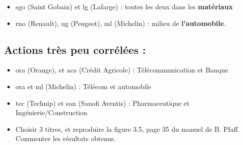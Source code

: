\documentclass[
]{article}
\newenvironment{Shaded}{\begin{snugshade}}{\end{snugshade}}
\newcommand{\AttributeTok}[1]{\textcolor[rgb]{0.77,0.63,0.00}{#1}}
\newcommand{\DecValTok}[1]{\textcolor[rgb]{0.00,0.00,0.81}{#1}}
\newcommand{\FunctionTok}[1]{\textcolor[rgb]{0.00,0.00,0.00}{#1}}
\newcommand{\NormalTok}[1]{#1}
\newcommand{\OtherTok}[1]{\textcolor[rgb]{0.56,0.35,0.01}{#1}}
\newcommand{\SpecialCharTok}[1]{\textcolor[rgb]{0.00,0.00,0.00}{#1}}
\newcommand{\StringTok}[1]{\textcolor[rgb]{0.31,0.60,0.02}{#1}}
\providecommand{\tightlist}{%
  \setlength{\itemsep}{0pt}\setlength{\parskip}{0pt}}
\begin{document}
\begin{itemize}
\tightlist
\item
  sgo (Saint Gobain) et lg (Lafarge) : toutes les deux dans les
  \textbf{matériaux}
\item
  rno (Renault), ug (Peugeot), ml (Michelin) : milieu de
  \textbf{l'automobile}.
\end{itemize}

\hypertarget{actions-truxe8s-peu-corruxe9luxe9es}{%
\subsection{Actions très peu corrélées
:}\label{actions-truxe8s-peu-corruxe9luxe9es}}

\begin{itemize}
\item
  ora (Orange), et aca (Crédit Agricole) : Télécommunication et Banque
\item
  ora et ml (Michelin) : Télécom et automobile
\item
  tec (Technip) et san (Sanofi Aventis) : Pharmaceutique et
  Ingénierie/Construction
\item
  Choisir 3 titres, et reproduire la figure 3.5, page 35 du manuel de B.
  Pfaff. Commenter les résultats obtenus.
\end{itemize}

\begin{Shaded}
\end{Shaded}
\end{document}

